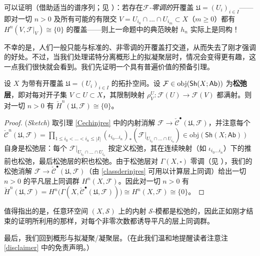 \begin{Rem}
可以证明（借助适当的谱序列；见 \cite[Theorem III.8.3b]{[GM03]}）：若存在\textit{$\mathcal{F}$-零调的}开覆盖 $\mathfrak{U}=(U_i)_{i\in I}$——即对一切 $n>0$ 及所有可能的有限交 $V=U_{i_0}\cap...\cap U_{i_m}\subset X$（$m\geq 0$）都有 $H^n(V,\mathcal{F}|_V)\cong\{0\}$ 的覆盖——则上一命题中的典范映射 $h_n$ 实际上是同构！
\end{Rem}

不幸的是，人们一般只能与标准的、非零调的开覆盖打交道，从而失去了刚才强调的好处。不过，当我们处理诺特分离概形上的拟凝聚层时，情况会变得更有趣，这一点我们很快就会看到。我们先证明一个具有普遍价值的预备引理。

\begin{Lem}\label{Cechonflasqueistrivial}
设 $X$ 为带有开覆盖 $\mathfrak{U}=(U_i)_{i\in I}$ 的拓扑空间。设 $\mathcal{F}\in\textup{obj}(\mathsf{Sh}(X;\mathsf{Ab}))$ 为\textbf{松弛层}，即对每对开子集 $V\subset U\subset X$，其限制映射 $\rho_V^U:\mathcal{F}(U)\rightarrow\mathcal{F}(V)$ 都满射。则对一切 $n>0$ 有 $\check{H}^n(\mathfrak{U},\mathcal{F})\cong\{0\}$。
\end{Lem}

\begin{proof}(\textit{Sketch})
取引理 \ref{Cechinjres} 中的内射消解 $\mathcal{F}\rightarrow \check{\mathcal{C}}^\bullet(\mathfrak{U},\mathcal{F})$，并注意每个 $\check{\mathcal{C}}^n(\mathfrak{U},\mathcal{F})=\prod_{1\leq i_0<...<i_n\leq |I|}(\iota_{i_0...i_n})_*(\mathcal{F}|_{U_{i_0}\cap...\cap U_{i_n}})\in\text{obj}(\mathsf{Sh}(X;\mathsf{Ab}))$ 自身是松弛层：每个 $\mathcal{F}|_{U_{i_0}\cap...\cap U_{i_n}}$ 按定义松弛，其在连续映射（如 $\iota_{i_0...i_n}$）下的推前也松弛，最后松弛层的积也松弛。由于松弛层对 $\Gamma(X,\square)$ 零调（见 \cite[Remark III.2.5.1]{[Har77]}），我们的松弛消解 $\mathcal{F}\rightarrow \check{\mathcal{C}}^\bullet(\mathfrak{U},\mathcal{F})$（由 \eqref{classderinjres} 可用以计算层上同调）给出一切 $n>0$ 的平凡层上同调群 $H^n(X,\mathcal{F})$。因此对一切 $n>0$ 有 $\check{H}^n(\mathfrak{U},\mathcal{F})=H^n\big(\Gamma(X,\check{\mathcal{C}}^\bullet(\mathfrak{U},\mathcal{F}))\big)\cong H^n(X,\mathcal{F})\cong\{0\}$。 
\end{proof}

值得指出的是，任意环空间 $(X,\mathcal{S})$ 上的内射 $\mathcal{S}$-模都是松弛的，因此正如刚才结束的证明所利用的那样，对每个非零次数都诱导平凡的层上同调群。

\vspace*{0.3cm}
\noindent 最后，我们回到概形与拟凝聚/凝聚层。（在此我们温和地提醒读者注意注 \ref{disclaimer} 中的免责声明。）


